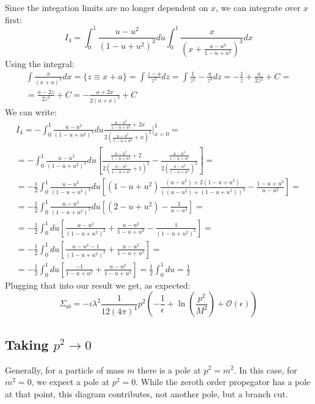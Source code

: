 \documentclass{article}
\begin{document}
Since the integation limits are no longer dependent on $x$, we can integrate over $x$ first:
\begin{equation}
    I_4 = \int_0^{1} \frac{u - u^2}{\left(1 - u + u^2\right)^3} du \int_0^1 \frac{x}{\left(x + \frac{u - u^2}{1 - u + u^2}\right)^3} dx
\end{equation}
Using the integral:
\begin{equation}
\begin{gathered}
    \int \frac{x}{(x + a)^3}dx = \{ z \equiv x + a \} = \int \frac{z - a}{z^3}dz = \int \frac{1}{z^2} - \frac{a}{z^3} dz = -\frac{1}{z} + \frac{a}{2z^2} + C = \\ =
    \frac{a - 2z}{2z^2} + C = -\frac{a + 2x}{2(a + x)^2} + C
\end{gathered}
\end{equation}
We can write:
\begin{equation}
\begin{gathered}
    I_4 = -\int_0^{1} \frac{u - u^2}{\left(1 - u + u^2\right)^3} du 
    \frac{\frac{u - u^2}{1 - u + u^2} + 2x}{2\left(\frac{u - u^2}{1 - u + u^2} + x\right)^2}\Bigg|_{x=0}^1 = \\ =
     -\int_0^{1} \frac{u - u^2}{\left(1 - u + u^2\right)^3} du 
    \left[
        \frac{\frac{u - u^2}{1 - u + u^2} + 2}{2\left(\frac{u - u^2}{1 - u + u^2} + 1\right)^2} - 
        \frac{\frac{u - u^2}{1 - u + u^2}}{2\left(\frac{u - u^2}{1 - u + u^2}\right)^2}
    \right] = \\ =
     -\frac{1}{2}\int_0^{1} \frac{u - u^2}{\left(1 - u + u^2\right)^3} du 
    \left[
        (1 - u + u^2)\frac{(u - u^2) + 2(1 - u + u^2)}{\left((u - u^2) + (1 - u + u^2)\right)^2} - \frac{1 - u + u^2}{u - u^2}
    \right] = \\ =
     -\frac{1}{2}\int_0^{1} \frac{u - u^2}{\left(1 - u + u^2\right)^2} du 
    \left[
        (2 - u + u^2) - \frac{1}{u - u^2}
    \right] = \\ =
    -\frac{1}{2} \int_0^{1} du \left[
        \frac{u - u^2}{\left(1 - u + u^2\right)^2} +
        \frac{u - u^2}{1 - u + u^2} -
        \frac{1}{\left(1 - u + u^2\right)^2}
    \right] = \\ =
    -\frac{1}{2} \int_0^{1} du \left[
        \frac{u - u^2 - 1}{\left(1 - u + u^2\right)^2} +
        \frac{u - u^2}{1 - u + u^2}
    \right] = \\ =
    -\frac{1}{2} \int_0^{1} du \left[
        \frac{-1}{1 - u + u^2} +
        \frac{u - u^2}{1 - u + u^2}
    \right] = \frac{1}{2}\int_0^1 du = \frac{1}{2}
\end{gathered}
\end{equation}
Plugging that into our result we get, as expected:
\begin{equation}
    \Sigma_\Theta = -i\lambda^2 \frac{1}{12(4\pi)^4} p^2 \left(-\frac{1}{\epsilon} + \ln(\frac{p^2}{M^2}) + \mathcal{O}(\epsilon)\right)
\end{equation}
\subsection{Taking $p^2 \rightarrow 0$}
Generally, for a particle of mass $m$ there is a pole at $p^2 = m^2$. In this case, for $m^2 = 0$, we expect a pole at $p^2 = 0$. While the zeroth order propegator has a pole at that point, this diagram contributes, not another pole, but a branch cut.
\end{document}
